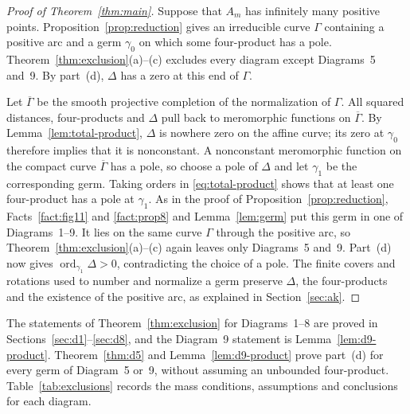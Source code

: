 \documentclass[11pt]{amsart}
\theoremstyle{definition}
\theoremstyle{remark}
\newcommand{\ord}{\operatorname{ord}}
\begin{document}
{\begin{proof}[Proof of Theorem~\ref{thm:main}]
Suppose that $A_m$ has infinitely many positive points.  Proposition~\ref{prop:reduction}
gives an irreducible curve $\Gamma$ containing a positive arc and a germ $\gamma_0$ on which
some four-product has a pole.  Theorem~\ref{thm:exclusion}(a)--(c) excludes every diagram
except Diagrams~5 and~9.  By part~(d), $\Delta$ has a zero at this end of $\Gamma$.

Let $\overline\Gamma$ be the smooth projective completion of the normalization of $\Gamma$.
All squared distances, four-products and $\Delta$ pull back to meromorphic functions on
$\overline\Gamma$.  By Lemma~\ref{lem:total-product}, $\Delta$ is nowhere zero on the affine
curve; its zero at $\gamma_0$ therefore implies that it is nonconstant.  A nonconstant
meromorphic function on the compact curve $\overline\Gamma$ has a pole, so choose a pole
of $\Delta$ and let $\gamma_1$ be the corresponding germ.  Taking orders in
\eqref{eq:total-product} shows that at least one four-product has a pole at $\gamma_1$.
As in the proof of Proposition~\ref{prop:reduction}, Facts~\ref{fact:fig11} and
\ref{fact:prop8} and Lemma~\ref{lem:germ} put this germ in one of Diagrams~1--9.
It lies on the same curve $\Gamma$ through the positive arc, so
Theorem~\ref{thm:exclusion}(a)--(c) again leaves only Diagrams~5 and~9.  Part~(d) now gives
$\ord_{\gamma_1}\Delta>0$, contradicting the choice of a pole.
The finite covers and rotations used to number and normalize a germ preserve $\Delta$,
the four-products and the existence of the positive arc, as explained in Section~\ref{sec:ak}.
\end{proof}

The statements of Theorem~\ref{thm:exclusion} for Diagrams~1--8 are proved in
Sections~\ref{sec:d1}--\ref{sec:d8}, and the Diagram~9 statement is Lemma~\ref{lem:d9-product}.
Theorem~\ref{thm:d5} and Lemma~\ref{lem:d9-product} prove part~(d) for every germ of
Diagram~5 or~9, without assuming an unbounded four-product.
Table~\ref{tab:exclusions} records the mass conditions, assumptions and conclusions for each
diagram.

\begin{table}[ht]


\end{table}}
\end{document}

